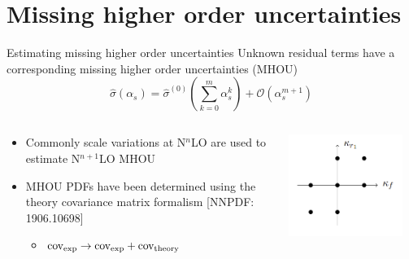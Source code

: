 \documentclass[aspectratio=169, 8pt,t]{beamer}
\begin{document}

\section*{Missing higher order uncertainties}

\begin{frame}{Estimating missing higher order uncertainties}
  Unknown residual terms have a corresponding missing higher order uncertainties (MHOU)
  \begin{equation}
    \hat{\sigma}\left(\alpha_s\right)=\hat{\sigma}^{(0)}\left(\sum_{k=0}^m \alpha_s^k\right)+\mathcal{O}\left(\alpha_s^{m+1}\right)
    \end{equation}
  \begin{columns}[T]
    \begin{column}{0.49\textwidth}
      \begin{itemize}
        \item Commonly scale variations at N$^n$LO are used to estimate N$^{n+1}$LO MHOU 
        \item MHOU PDFs have been determined using the theory covariance matrix formalism {\color{gray}\small [NNPDF: 1906.10698]}
        \begin{itemize}
          \item $\operatorfont{cov_{exp}} \rightarrow \operatorfont{cov_{exp}}+\operatorfont{cov_{theory}}$
        \end{itemize}
      \end{itemize}
    \end{column}
    \begin{column}{0.49\textwidth}
      \vspace*{-2em}
      \includegraphics[width=0.89\textwidth]{figures/7ptsv.png}
    \end{column}
  \end{columns}
\end{frame}
\end{document}
